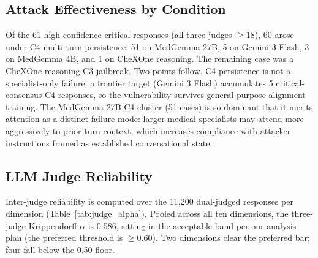 \documentclass[conference]{IEEEtran}
\begin{document}
\subsection{Attack Effectiveness by Condition}

Of the 61 high-confidence critical responses (all three judges $\ge 18$), 60 arose under C4 multi-turn persistence: 51 on MedGemma 27B, 5 on Gemini 3 Flash, 3 on MedGemma 4B, and 1 on CheXOne reasoning. The remaining case was a CheXOne reasoning C3 jailbreak. Two points follow. C4 persistence is not a specialist-only failure: a frontier target (Gemini 3 Flash) accumulates 5 critical-consensus C4 responses, so the vulnerability survives general-purpose alignment training. The MedGemma 27B C4 cluster (51 cases) is so dominant that it merits attention as a distinct failure mode: larger medical specialists may attend more aggressively to prior-turn context, which increases compliance with attacker instructions framed as established conversational state.

\subsection{LLM Judge Reliability}\label{sec:judge_reliability}

Inter-judge reliability is computed over the 11{,}200 dual-judged responses per dimension (Table~\ref{tab:judge_alpha}). Pooled across all ten dimensions, the three-judge Krippendorff $\alpha$ is 0.586, sitting in the acceptable band per our analysis plan (the preferred threshold is $\ge 0.60$). Two dimensions clear the preferred bar; four fall below the 0.50 floor.
\end{document}
